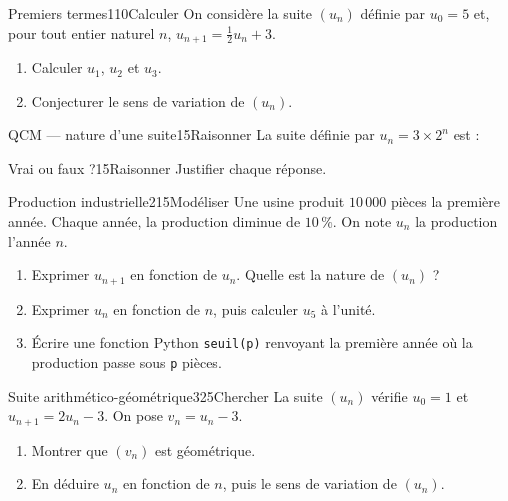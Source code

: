 \documentclass{gabarits/nexus-manuel-v5}
\begin{document}

\begin{exerciceSix}{Premiers termes}{1}{10}{Calculer}
On considère la suite $(u_n)$ définie par $u_0 = 5$ et, pour tout entier
naturel $n$, $u_{n+1} = \frac{1}{2}u_n + 3$.
\begin{enumerate}
  \item Calculer $u_1$, $u_2$ et $u_3$.
  \item Conjecturer le sens de variation de $(u_n)$.
\end{enumerate}
\end{exerciceSix}

\begin{exerciceSix}{QCM --- nature d'une suite}{1}{5}{Raisonner}
La suite définie par $u_n = 3 \times 2^n$ est :
\end{exerciceSix}

\begin{exerciceSix}{Vrai ou faux ?}{1}{5}{Raisonner}
Justifier chaque réponse.
\end{exerciceSix}


\begin{exerciceSix}[\pictoPython]{Production industrielle}{2}{15}{Modéliser}
Une usine produit $10\,000$ pièces la première année. Chaque année, la
production diminue de $10\,\%$. On note $u_n$ la production l'année $n$.
\begin{enumerate}
  \item Exprimer $u_{n+1}$ en fonction de $u_n$. Quelle est la nature de
    $(u_n)$ ?
  \item Exprimer $u_n$ en fonction de $n$, puis calculer $u_5$ à l'unité.
  \item Écrire une fonction Python \lstinline|seuil(p)| renvoyant la
    première année où la production passe sous \lstinline|p| pièces.
\end{enumerate}
\end{exerciceSix}


\begin{exerciceSix}{Suite arithmético-géométrique}{3}{25}{Chercher}
La suite $(u_n)$ vérifie $u_0 = 1$ et $u_{n+1} = 2u_n - 3$.
On pose $v_n = u_n - 3$.
\begin{enumerate}
  \item Montrer que $(v_n)$ est géométrique.
  \item En déduire $u_n$ en fonction de $n$, puis le sens de variation
    de $(u_n)$.
\end{enumerate}
\end{exerciceSix}
\end{document}
